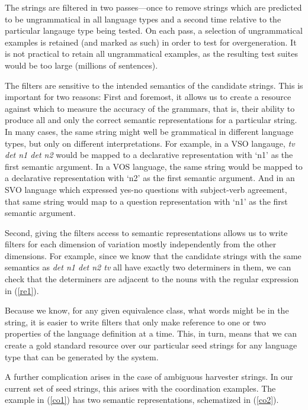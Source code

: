 \documentclass[11pt]{article}
\begin{document}
The strings are filtered in two passes---once to remove strings which
are predicted to be ungrammatical in all language types and a second time
relative to the particular langauge type being tested.  On each
pass, a selection of ungrammatical examples is retained (and marked as such)
in order to test for overgeneration.  It is not practical to retain
all ungrammatical examples, as the resulting test suites would be too
large (millions of sentences).

The filters are sensitive to the intended semantics of the candidate
strings.  This is important for two reasons: First and foremost, it
allows us to create a resource against which to measure the accuracy
of the grammars, that is, their ability to produce all and only the
correct semantic representations for a particular string.  In many
cases, the same string might well be grammatical in different language
types, but only on different interpretations.  For example, in a VSO
langauge, {\it tv det n1 det n2} would be mapped to a declarative
representation with `n1' as the first semantic argument.  In a VOS
language, the same string would be mapped to a declarative
representation with `n2' as the first semantic argument.  And in an
SVO language which expressed yes-no questions with subject-verb
agreement, that same string would map to a question representation
with `n1' as the first semantic argument.

Second, giving the filters access to semantic representations allows
us to write filters for each dimension of variation mostly
independently from the other dimensions.  For example, since we know
that the candidate strings with the same semantics as {\it det n1 det
n2 tv} all have exactly two determiners in them, we can check that the
determiners are adjacent to the nouns with the regular expression in
(\ref{re1}).

\enumsentence{\label{re1}
{\tt\small det n[12].*det n[12] $\mid$ det n[12].*n[12] det $\mid$ n[12] det.*n[12] det $\mid$ n[12] det.*det n[12]}
}
%
Because we know, for any given equivalence class, what words might be
in the string, it is easier to write filters that only make reference
to one or two properties of the language definition at a time. This,
in turn, means that we can create a gold standard resource over our
particular seed strings for any language type that can be generated by
the system.

A further complication arises in the case of ambiguous harvester
strings.  In our current set of seed strings, this arises with
the coordination examples.  The example in (\ref{co1}) has two
semantic representations, schematized in (\ref{co2}).
\end{document}
